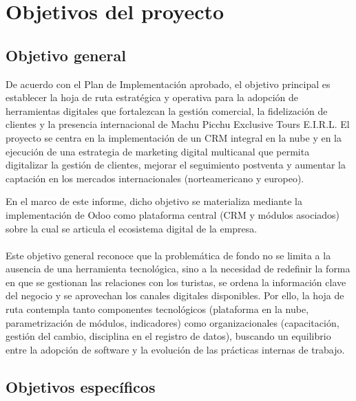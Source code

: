 \section{Objetivos del proyecto}

\subsection{Objetivo general}

\begin{indentedsubsection}
De acuerdo con el Plan de Implementación aprobado, el objetivo principal es establecer la hoja de ruta estratégica y operativa para la adopción de herramientas digitales que fortalezcan la gestión comercial, la fidelización de clientes y la presencia internacional de Machu Picchu Exclusive Tours E.I.R.L. El proyecto se centra en la implementación de un CRM integral en la nube y en la ejecución de una estrategia de marketing digital multicanal que permita digitalizar la gestión de clientes, mejorar el seguimiento postventa y aumentar la captación en los mercados internacionales (norteamericano y europeo).

En el marco de este informe, dicho objetivo se materializa mediante la implementación de Odoo como plataforma central (CRM y módulos asociados) sobre la cual se articula el ecosistema digital de la empresa.
\\
\\
Este objetivo general reconoce que la problemática de fondo no se limita a la ausencia de una herramienta tecnológica, sino a la necesidad de redefinir la forma en que se gestionan las relaciones con los turistas, se ordena la información clave del negocio y se aprovechan los canales digitales disponibles. Por ello, la hoja de ruta contempla tanto componentes tecnológicos (plataforma en la nube, parametrización de módulos, indicadores) como organizacionales (capacitación, gestión del cambio, disciplina en el registro de datos), buscando un equilibrio entre la adopción de software y la evolución de las prácticas internas de trabajo.

\end{indentedsubsection}

\subsection{Objetivos específicos}

